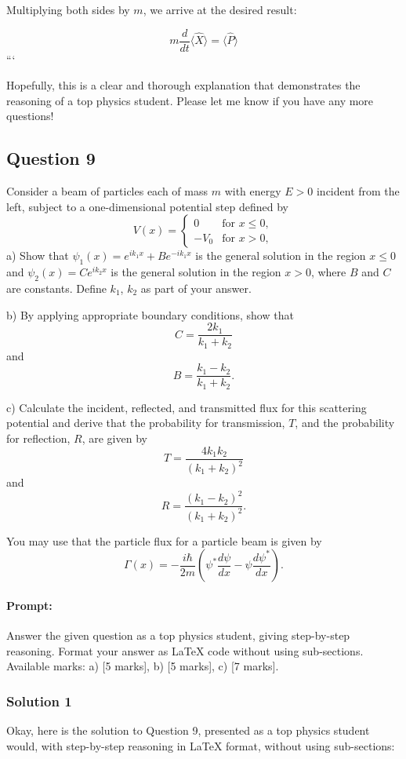 \documentclass{article}
\begin{document}
\noindent Multiplying both sides by $m$, we arrive at the desired result:

\begin{equation}
m \frac{d}{dt} \langle \hat{X} \rangle = \langle \hat{P} \rangle
\end{equation}
```

Hopefully, this is a clear and thorough explanation that demonstrates the reasoning of a top physics student. Please let me know if you have any more questions!


\subsection{Question 9}
Consider a beam of particles each of mass $m$ with energy $E > 0$ incident from the left, subject to a one-dimensional potential step defined by
\[
V(x) =
\begin{cases}
0 & \text{for } x \leq 0, \\
-V_0 & \text{for } x > 0,
\end{cases}
\]
a) Show that $\psi_1(x) = e^{ik_1x} + Be^{-ik_1x}$ is the general solution in the region $x \leq 0$ and $\psi_2(x) = Ce^{ik_2x}$ is the general solution in the region $x > 0$, where $B$ and $C$ are constants. Define $k_1$, $k_2$ as part of your answer.

b) By applying appropriate boundary conditions, show that
\[
C = \frac{2k_1}{k_1 + k_2}
\]
and
\[
B = \frac{k_1 - k_2}{k_1 + k_2}.
\]

c) Calculate the incident, reflected, and transmitted flux for this scattering potential and derive that the probability for transmission, $T$, and the probability for reflection, $R$, are given by
\[
T = \frac{4k_1k_2}{(k_1 + k_2)^2}
\]
and
\[
R = \frac{(k_1 - k_2)^2}{(k_1 + k_2)^2}.
\]

You may use that the particle flux for a particle beam is given by
\[
\Gamma(x) = -\frac{i\hbar}{2m} \left( \psi^* \frac{d\psi}{dx} - \psi \frac{d\psi^*}{dx} \right).
\]


\paragraph{Prompt: \\} 
Answer the given question as a top physics student, giving step-by-step reasoning. Format your answer as LaTeX code without using sub-sections. Available marks: a) [5 marks], b) [5 marks], c) [7 marks].

\subsubsection{Solution 1}
Okay, here is the solution to Question 9, presented as a top physics student would, with step-by-step reasoning in LaTeX format, without using sub-sections:
\end{document}
